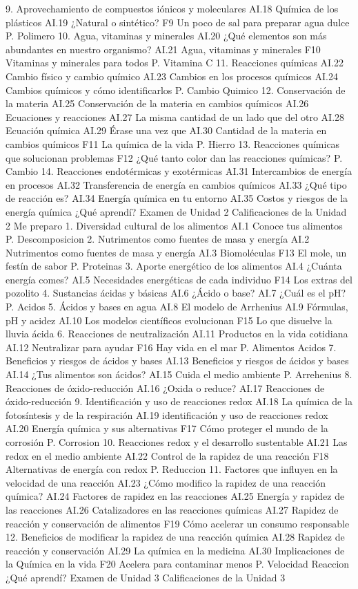 9.	Aprovechamiento de compuestos iónicos y moleculares
AI.18	Química de los plásticos
AI.19	¿Natural o sintético?
F9	Un poco de sal para preparar agua dulce
P. Polimero
10.	Agua, vitaminas y minerales
AI.20	¿Qué elementos son más abundantes en nuestro organismo?
AI.21	Agua, vitaminas y minerales
F10	Vitaminas y minerales para todos
P. Vitamina C
11.	Reacciones químicas
AI.22	Cambio físico y cambio químico
AI.23	Cambios en los procesos químicos
AI.24	Cambios químicos y cómo identificarlos
P. Cambio Quimico
12.	Conservación de la materia
AI.25	Conservación de la materia en cambios químicos
AI.26	Ecuaciones y reacciones
AI.27	La misma cantidad de un lado que del otro
AI.28	Ecuación química
AI.29	Érase una vez que
AI.30	Cantidad de la materia en cambios químicos
F11	La química de la vida
P. Hierro
13.	Reacciones químicas que solucionan problemas
F12	¿Qué tanto color dan las reacciones químicas?
P. Cambio
14.	Reacciones endotérmicas y exotérmicas
AI.31	Intercambios de energía en procesos
AI.32	Transferencia de energía en cambios químicos
AI.33	¿Qué tipo de reacción es?
AI.34	Energía química en tu entorno
AI.35	Costos y riesgos de la energía química
¿Qué aprendí?
Examen de Unidad 2
Calificaciones de la Unidad 2
Me preparo
1.	Diversidad cultural de los alimentos
AI.1	Conoce tus alimentos
P. Descomposicion
2.	Nutrimentos como fuentes de masa y energía
AI.2	Nutrimentos como fuentes de masa y energía
AI.3	Biomoléculas
F13	El mole, un festín de sabor
P. Proteinas
3.	Aporte energético de los alimentos
AI.4	¿Cuánta energía comes?
AI.5	Necesidades energéticas de cada individuo
F14	Los extras del pozolito
4.	Sustancias ácidas y básicas
AI.6	¿Ácido o base?
AI.7	¿Cuál es el pH?
P. Acidos
5.	Ácidos y bases en agua
AI.8	El modelo de Arrhenius
AI.9	Fórmulas, pH y acidez
AI.10	Los modelos científicos evolucionan
F15	Lo que disuelve la lluvia ácida
6.	Reacciones de neutralización
AI.11	Productos en la vida cotidiana
AI.12	Neutralizar para ayudar
F16	Hay vida en el mar
P. Alimentos Acidos
7.	Beneficios y riesgos de ácidos y bases
AI.13	Beneficios y riesgos de ácidos y bases
AI.14	¿Tus alimentos son ácidos?
AI.15	Cuida el medio ambiente
P. Arrehenius
8.	Reacciones de óxido-reducción
AI.16	¿Oxida o reduce?
AI.17	Reacciones de óxido-reducción
9.	Identificación y uso de reacciones redox
AI.18	La química de la fotosíntesis y de la respiración
AI.19	identificación y uso de reacciones redox
AI.20	Energía química y sus alternativas
F17	Cómo proteger el mundo de la corrosión
P. Corrosion
10.	Reacciones redox y el desarrollo sustentable
AI.21	Las redox en el medio ambiente
AI.22	Control de la rapidez de una reacción
F18	Alternativas de energía con redox
P. Reduccion
11.	Factores que influyen en la velocidad de una reacción
AI.23	¿Cómo modifico la rapidez de una reacción química?
AI.24	Factores de rapidez en las reacciones
AI.25	Energía y rapidez de las reacciones
AI.26	Catalizadores en las reacciones químicas
AI.27	Rapidez de reacción y conservación de alimentos
F19	Cómo acelerar un consumo responsable
12.	Beneficios de modificar la rapidez de una reacción química
AI.28	Rapidez de reacción y conservación
AI.29	La química en la medicina
AI.30	Implicaciones de la Química en la vida
F20	Acelera para contaminar menos
P. Velocidad Reaccion
¿Qué aprendí?
Examen de Unidad 3
Calificaciones de la Unidad 3